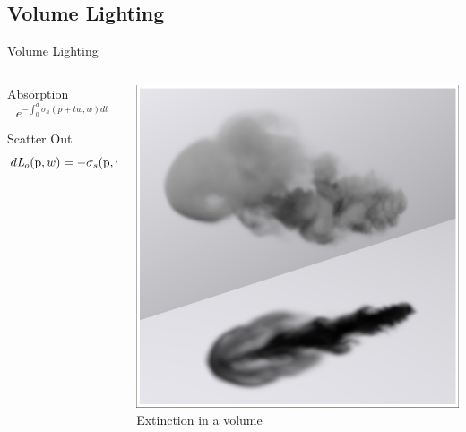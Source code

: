 \documentclass[10pt,handout,compress,professionalfont]{beamer}
\begin{document}
\subsection{Volume Lighting}
\begin{frame}{Volume Lighting}

    \begin{columns}
        \begin{column}{0.55\textwidth}

            \vspace{-10mm}
            \begin{block}{Absorption}
                \[
                    e^{-\int_{0}^{d}\sigma_{a} (p+t\mathit{w},\mathit{w})d\mathit{t}}
                \]
            \end{block}

            \begin{block}{Scatter Out}
                \[
                    d\mathit{L}_{o}(\textup{p},w) = -\sigma_{s}(\textup{p},w) \mathit{L}_{i}(\textup{p},-w)dt
                \]
            \end{block}

        \end{column}
        \begin{column}{0.45\textwidth}
            \vspace{-4mm}
            \includegraphics[width=\textwidth]{../img/external/scatter}\\
            {\centering\scriptsize Extinction in a volume\\}
        \end{column}
    \end{columns}

\end{frame}
\end{document}
